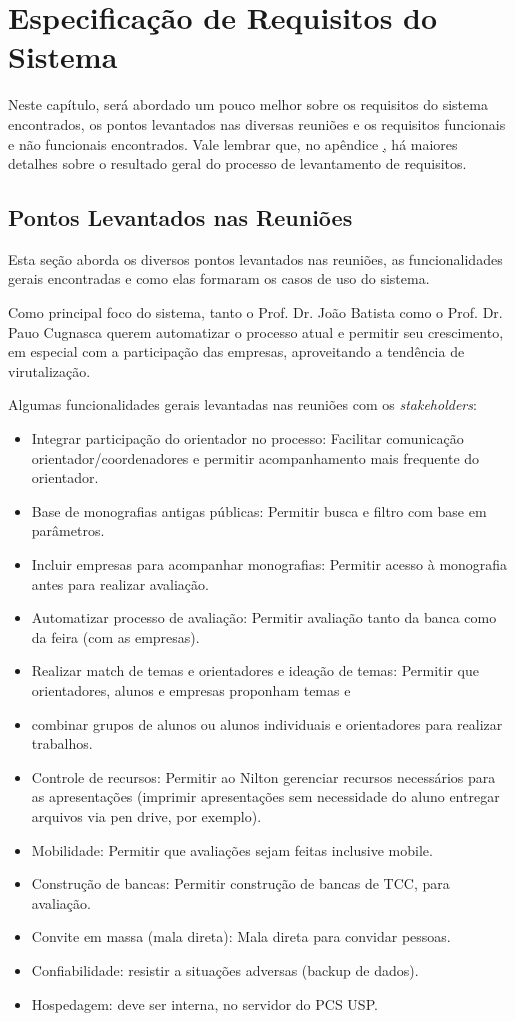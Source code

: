 \chapter{Especificação de Requisitos do Sistema}
Neste capítulo, será abordado um pouco melhor sobre os requisitos do sistema encontrados, os pontos levantados nas diversas reuniões e os requisitos funcionais e não funcionais encontrados. Vale lembrar que, no apêndice \href{chap:vision-doc-appendix}, há maiores detalhes sobre o resultado geral do processo de levantamento de requisitos.

\section{Pontos Levantados nas Reuniões}
Esta seção aborda os diversos pontos levantados nas reuniões, as funcionalidades gerais encontradas e como elas formaram os casos de uso do sistema.

Como principal foco do sistema, tanto o Prof. Dr. João Batista como o Prof. Dr. Pauo Cugnasca querem automatizar o processo atual e permitir seu crescimento, em especial com a participação das empresas, aproveitando a tendência de virutalização.

Algumas funcionalidades gerais levantadas nas reuniões com os \textit{stakeholders}:

\begin{itemize}
    \item Integrar participação do orientador no processo: Facilitar comunicação orientador/coordenadores e permitir acompanhamento mais frequente do orientador.
    \item Base de monografias antigas públicas: Permitir busca e filtro com base em parâmetros.
    \item Incluir empresas para acompanhar monografias: Permitir acesso à monografia antes para realizar avaliação.
    \item Automatizar processo de avaliação: Permitir avaliação tanto da banca como da feira (com as empresas).
    \item Realizar match de temas e orientadores e ideação de temas: Permitir que orientadores, alunos e empresas proponham temas e
    \item combinar grupos de alunos ou alunos individuais e orientadores para realizar trabalhos.
    \item Controle de recursos: Permitir ao Nilton gerenciar recursos necessários para as apresentações (imprimir apresentações sem necessidade do aluno entregar arquivos via pen drive, por exemplo).
    \item Mobilidade: Permitir que avaliações sejam feitas inclusive mobile.
    \item Construção de bancas: Permitir construção de bancas de TCC, para avaliação.
    \item Convite em massa (mala direta): Mala direta para convidar pessoas.
    \item Confiabilidade: resistir a situações adversas (backup de dados).
    \item Hospedagem: deve ser interna, no servidor do PCS USP.
\end{itemize}

